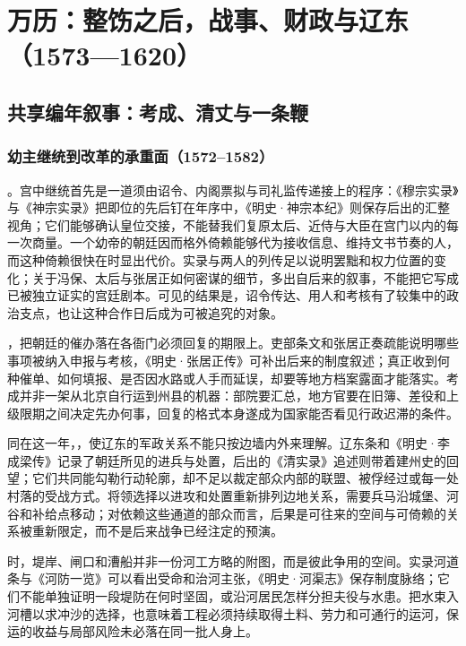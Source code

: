 \chapter{万历：整饬之后，战事、财政与辽东（1573—1620）}
\label{ch:wanli}

\section{共享编年叙事：考成、清丈与一条鞭}




\subsection{幼主继统到改革的承重面（1572--1582）}

。宫中继统首先是一道须由诏令、内阁票拟与司礼监传递接上的程序：《穆宗实录》与《神宗实录》把即位的先后钉在年序中，《明史·神宗本纪》则保存后出的汇整视角；它们能够确认皇位交接，不能替我们复原太后、近侍与大臣在宫门以内的每一次商量。一个幼帝的朝廷因而格外倚赖能够代为接收信息、维持文书节奏的人，而这种倚赖很快在时显出代价。实录与两人的列传足以说明罢黜和权力位置的变化；关于冯保、太后与张居正如何密谋的细节，多出自后来的叙事，不能把它写成已被独立证实的宫廷剧本。可见的结果是，诏令传达、用人和考核有了较集中的政治支点，也让这种合作日后成为可被追究的对象。

，把朝廷的催办落在各衙门必须回复的期限上。吏部条文和张居正奏疏能说明哪些事项被纳入申报与考核，《明史·张居正传》可补出后来的制度叙述；真正收到何种催单、如何填报、是否因水路或人手而延误，却要等地方档案露面才能落实。考成并非一架从北京自行运到州县的机器：部院要汇总，地方官要在旧簿、差役和上级限期之间决定先办何事，回复的格式本身遂成为国家能否看见行政迟滞的条件。

同在这一年，，使辽东的军政关系不能只按边墙内外来理解。辽东条和《明史·李成梁传》记录了朝廷所见的进兵与处置，后出的《清实录》追述则带着建州史的回望；它们共同能勾勒行动轮廓，却不足以裁定部众内部的联盟、被俘经过或每一处村落的受战方式。将领选择以进攻和处置重新排列边地关系，需要兵马沿城堡、河谷和补给点移动；对依赖这些通道的部众而言，后果是可往来的空间与可倚赖的关系被重新限定，而不是后来战争已经注定的预演。

时，堤岸、闸口和漕船并非一份河工方略的附图，而是彼此争用的空间。实录河道条与《河防一览》可以看出受命和治河主张，《明史·河渠志》保存制度脉络；它们不能单独证明一段堤防在何时坚固，或沿河居民怎样分担夫役与水患。把水束入河槽以求冲沙的选择，也意味着工程必须持续取得土料、劳力和可通行的运河，保运的收益与局部风险未必落在同一批人身上。

